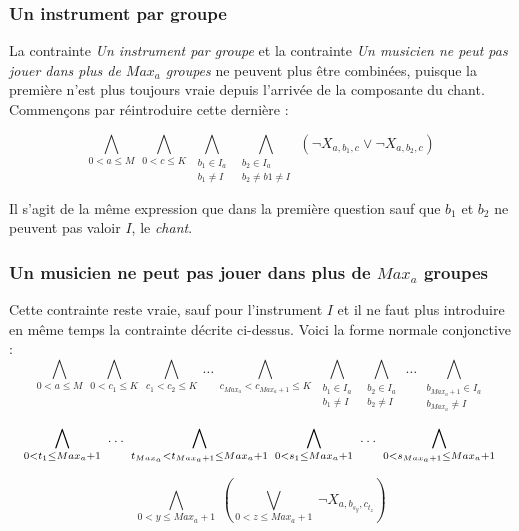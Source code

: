 \documentclass[11pt]{article}
\begin{document}
\subsubsection{Un instrument par groupe}

La contrainte \textsl{Un instrument par groupe} et la contrainte \textsl{Un musicien ne peut pas jouer dans plus de $Max_a$ groupes} ne peuvent plus être combinées, puisque la première n'est plus toujours vraie depuis l'arrivée de la composante du chant.\\

Commençons par réintroduire cette dernière :

$$\bigwedge\limits_{0<a\le M}\ \bigwedge\limits_{0<c\le K}\ \bigwedge\limits_{\substack{b_1\in I_a \\ b_1 \ne I}}\ \bigwedge\limits_{\substack{b_2\in I_a \\ b_2 \ne b1 \ne I}}\ \left(\neg X_{a,b_1,c} \vee \neg X_{a,b_2,c}\right)$$

Il s'agit de la même expression que dans la première question sauf que $b_1$ et $b_2$ ne peuvent pas valoir $I$, le \textsl{chant}.

\subsubsection{Un musicien ne peut pas jouer dans plus de $Max_a$ groupes}

Cette contrainte reste vraie, sauf pour l'instrument $I$ et il ne faut plus introduire en même temps la contrainte décrite ci-dessus. Voici la forme normale conjonctive :\\

$$\bigwedge\limits_{0<a\le M}\ \bigwedge\limits_{0<c_1\le K}\ \bigwedge\limits_{c_1<c_2\le K}\ \ldots\ \bigwedge\limits_{c_{{Max_a}}<c_{Max_{a}+1}\le K}\ \bigwedge\limits_{\substack{b_1 \in I_a \\ b_1 \ne I}}\ \bigwedge\limits_{\substack{b_2 \in I_a \\ b_2 \ne I}}\ \ldots\  \bigwedge\limits_{\substack{b_{Max_a+1} \in I_a \\ b_{Max_a} \ne I}} $$

$$ \bigwedge\limits_{0<t_{1}\le Max_a+1}\  \ldots\  \bigwedge\limits_{t_{Max_a}<t_{Max_a+1}\le Max_a+1}\ \bigwedge\limits_{0<s_1\le Max_a+1}\  \ldots\  \bigwedge\limits_{0<s_{Max_a+1}\le Max_a+1}\\$$

$$ \bigwedge\limits_{0<y\le Max_a+1}\  \left( \bigvee\limits_{0<z\le Max_a+1}\  \neg X_{a,b_{s_{y}},c_{t_{z}}}\right)$$
\end{document}
